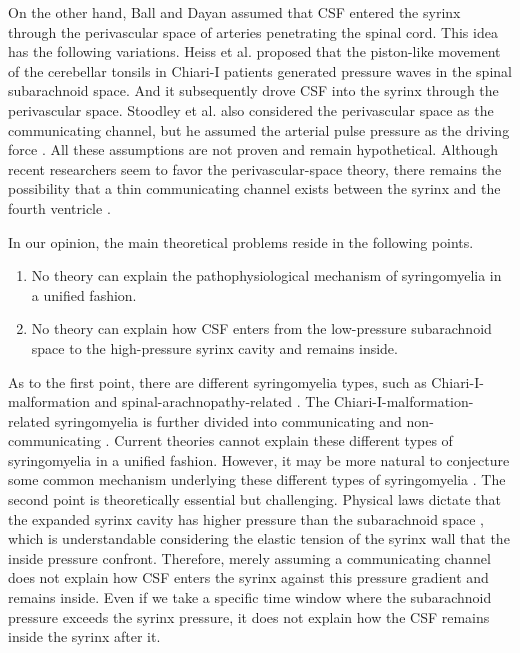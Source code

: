 \documentclass[fleqn,10pt]{wlscirep}
\begin{document}
On the other hand, Ball and Dayan \cite{ball1972pathogenesis} assumed that
CSF entered the syrinx through the perivascular space of arteries
penetrating the spinal cord. This idea has the following variations. Heiss
et al.  \cite{heiss1999elucidating} proposed that the piston-like movement
of the cerebellar tonsils in Chiari-I patients generated pressure waves in
the spinal subarachnoid space. And it subsequently drove CSF into the
syrinx through the perivascular space. Stoodley et al. also considered the
perivascular space as the communicating channel, but he assumed the
arterial pulse pressure as the driving force \cite{stoodley2000mechanisms}.
All these assumptions are not proven and remain hypothetical. Although
recent researchers seem to favor the perivascular-space theory, there
remains the possibility that a thin communicating channel exists between
the syrinx and the fourth ventricle \cite{chang2021hypothesis}. 

In our opinion, the main theoretical problems reside in the following
points.
\begin{enumerate}
    \item No theory can explain the pathophysiological mechanism of
syringomyelia in a unified fashion.
    \item No theory can explain how CSF enters from the low-pressure subarachnoid space to the high-pressure syrinx cavity and remains inside.
\end{enumerate}

As to the first point, there are different syringomyelia types, such as
Chiari-I-malformation and spinal-arachnopathy-related
\cite{klekamp1997treatment}. The Chiari-I-malformation-related
syringomyelia is further divided into communicating and non-communicating
\cite{elliott2013syringomyelia}. Current theories cannot explain these
different types of syringomyelia in a unified fashion. However, it may be
more natural to conjecture some common mechanism underlying these different
types of syringomyelia \cite{stoodley2000mechanisms}. The second point is
theoretically essential but challenging. Physical laws dictate that the
expanded syrinx cavity has higher pressure than the subarachnoid space
\cite{serwayr.a.2016fluids, heiss1999elucidating, davis1989mechanisms,
ellertsson1970distending}, which is understandable considering the elastic
tension of the syrinx wall that the inside pressure confront. Therefore,
merely assuming a communicating channel does not explain how CSF enters the
syrinx against this pressure gradient and remains inside. Even if we take a
specific time window where the subarachnoid pressure exceeds the syrinx
pressure, it does not explain how the CSF remains inside the syrinx after
it.
\end{document}
